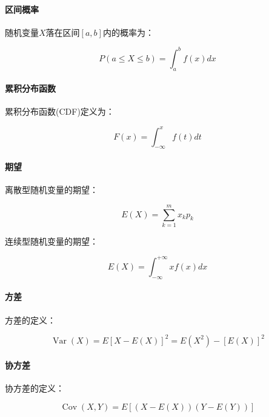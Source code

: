 \paragraph*{区间概率}

\begin{flushleft}
	随机变量$X$落在区间$[a,b]$内的概率为：
\end{flushleft}

\begin{equation}
P(a \leqslant X \leqslant b) = \int_a^b f(x) dx
\end{equation}

\paragraph*{累积分布函数}
\begin{flushleft}
累积分布函数(CDF)定义为：
\end{flushleft}
\begin{equation}
F(x) = \int_{-\infty}^x f(t) dt
\end{equation}

\paragraph*{期望}
\begin{flushleft}
离散型随机变量的期望：
\end{flushleft}
\begin{equation}
E(X) = \sum_{k=1}^m x_k p_k
\end{equation}
\begin{flushleft}
连续型随机变量的期望：
\end{flushleft}
\begin{equation}
E(X) = \int_{-\infty}^{+\infty} x f(x) dx
\end{equation}

\paragraph*{方差}
\begin{flushleft}
方差的定义：
\end{flushleft}
\begin{equation}
\operatorname{Var}(X) = E[X - E(X)]^2 = E(X^2) - [E(X)]^2
\end{equation}

\paragraph*{协方差}
\begin{flushleft}
协方差的定义：
\end{flushleft}
\begin{equation}
\operatorname{Cov}(X,Y) = E[(X-E(X))(Y-E(Y))]
\end{equation}


